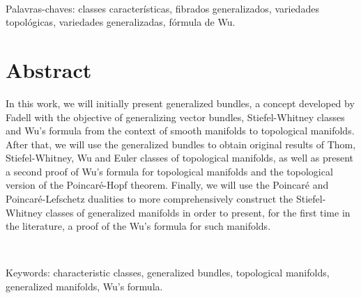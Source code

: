 \documentclass[12pt,oneside]{book} %
\begin{document}
\

\noindent Palavras-chaves: classes características, fibrados generalizados, variedades topológicas, variedades generalizadas, fórmula de Wu.










\chapter*{Abstract}
\thispagestyle{empty}

In this work, we will initially present generalized bundles, a concept developed by Fadell with the objective of generalizing vector bundles, Stiefel-Whitney classes and Wu's formula from the context of smooth manifolds to topological manifolds. After that, we will use the generalized bundles to obtain original results of Thom, Stiefel-Whitney, Wu and Euler classes of topological manifolds, as well as present a second proof of Wu's formula for topological manifolds and the topological version of the Poincaré-Hopf theorem. Finally, we will use the Poincaré and Poincaré-Lefschetz dualities to more comprehensively construct the Stiefel-Whitney classes of generalized manifolds in order to present, for the first time in the literature, a proof of the Wu's formula for such manifolds.

\

\noindent Keywords: characteristic classes, generalized bundles, topological manifolds, generalized manifolds, Wu's formula.





\end{document}
